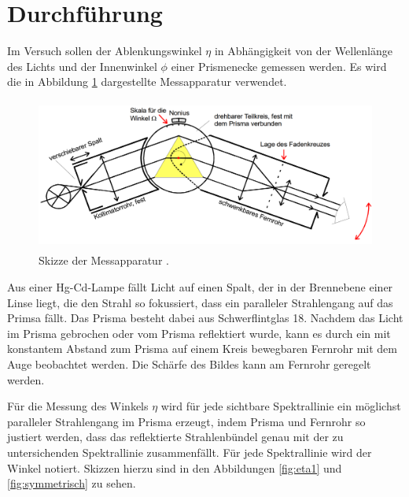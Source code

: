 \section{Durchführung}
\label{sec:Durchführung}
Im Versuch sollen der Ablenkungswinkel $\eta$ in Abhängigkeit von der Wellenlänge
des Lichts und der Innenwinkel $\phi$ einer Prismenecke gemessen werden. Es wird
die in Abbildung \ref{fig:geraet} dargestellte Messapparatur verwendet.

\begin{figure}[H]
  \centering
  \includegraphics[height=5cm]{data/aufbau.png}
  \caption{Skizze der Messapparatur \cite{Versuchsanleitung}.}
  \label{fig:geraet}
\end{figure}

Aus einer Hg-Cd-Lampe fällt Licht auf einen Spalt, der in der Brennebene einer Linse
liegt, die den Strahl so fokussiert, dass ein paralleler Strahlengang auf das Primsa fällt.
Das Prisma besteht dabei aus Schwerflintglas 18. Nachdem das Licht im Prisma gebrochen oder vom
Prisma reflektiert wurde, kann es durch ein mit konstantem Abstand zum Prisma auf
einem Kreis bewegbaren Fernrohr mit dem Auge beobachtet werden. Die Schärfe des Bildes
kann am Fernrohr geregelt werden.

Für die Messung des Winkels $\eta$ wird für jede sichtbare Spektrallinie ein möglichst
paralleler Strahlengang im Prisma erzeugt, indem Prisma und Fernrohr so justiert werden,
dass das reflektierte Strahlenbündel genau mit der zu untersichenden Spektrallinie zusammenfällt.
Für jede Spektrallinie wird der Winkel notiert. Skizzen hierzu sind in den Abbildungen
\ref{fig:eta1} und \ref{fig:symmetrisch} zu sehen.

